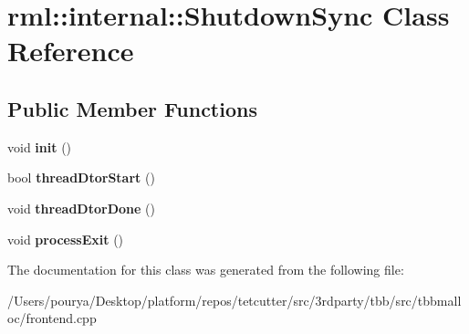 \hypertarget{classrml_1_1internal_1_1ShutdownSync}{}\section{rml\+:\+:internal\+:\+:Shutdown\+Sync Class Reference}
\label{classrml_1_1internal_1_1ShutdownSync}
\subsection*{Public Member Functions}
\begin{DoxyCompactItemize}
\item 
\hypertarget{classrml_1_1internal_1_1ShutdownSync_afffa916f72f345e256498c341488a4e6}{}void {\bfseries init} ()\label{classrml_1_1internal_1_1ShutdownSync_afffa916f72f345e256498c341488a4e6}

\item 
\hypertarget{classrml_1_1internal_1_1ShutdownSync_a5467aaf4a198ffbae69c1e0e446b9a02}{}bool {\bfseries thread\+Dtor\+Start} ()\label{classrml_1_1internal_1_1ShutdownSync_a5467aaf4a198ffbae69c1e0e446b9a02}

\item 
\hypertarget{classrml_1_1internal_1_1ShutdownSync_a81b701e495c816f144435b04bf92f45c}{}void {\bfseries thread\+Dtor\+Done} ()\label{classrml_1_1internal_1_1ShutdownSync_a81b701e495c816f144435b04bf92f45c}

\item 
\hypertarget{classrml_1_1internal_1_1ShutdownSync_afcd88cc7899464924316325f0ba1eca4}{}void {\bfseries process\+Exit} ()\label{classrml_1_1internal_1_1ShutdownSync_afcd88cc7899464924316325f0ba1eca4}

\end{DoxyCompactItemize}


The documentation for this class was generated from the following file\+:\begin{DoxyCompactItemize}
\item 
/\+Users/pourya/\+Desktop/platform/repos/tetcutter/src/3rdparty/tbb/src/tbbmalloc/frontend.\+cpp\end{DoxyCompactItemize}
